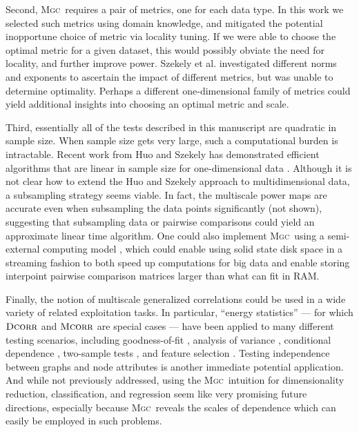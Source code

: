 \documentclass[11pt]{article}
\providecommand{\sct}[1]{{\normalfont\textsc{#1}}}
\newcommand{\Mgc}{\sct{Mgc}}
\newcommand{\Dcorr}{\sct{Dcorr}}
\newcommand{\Mcorr}{\sct{Mcorr}}
\begin{document}
Second, \Mgc~requires a pair of metrics, one for each data type. In this work we selected such metrics using domain knowledge, and mitigated the potential inopportune choice of metric via locality tuning.  If we were able to choose the optimal metric for a given dataset, this would possibly obviate the need for locality, and further improve power. Szekely et al. investigated different norms and exponents to ascertain the impact of different metrics, but was unable to determine optimality.
Perhaps a different one-dimensional family of metrics could yield additional insights into choosing an optimal metric and scale.

Third, essentially all of the tests described in this manuscript are quadratic in sample size.  When sample size gets very large, such a computational burden is intractable.  Recent work from Huo and Szekely  has demonstrated efficient algorithms that are linear in sample size  for one-dimensional data \cite{Huo2016}.  Although it is not clear how to extend the Huo and Szekely approach  to multidimensional data, a subsampling strategy seems viable.  In fact, the multiscale power maps are accurate even when subsampling the data points significantly (not shown), suggesting that subsampling data or pairwise comparisons  could yield an approximate linear time algorithm.  One could also implement \Mgc~using a semi-external computing model \cite{Zheng2016},  which could enable using solid state disk space in a streaming fashion to both speed up computations for big data and enable storing interpoint pairwise comparison matrices larger than what can fit in RAM.

Finally, the notion of multiscale generalized correlations could be used in a wide variety of related exploitation tasks.  In particular, ``energy statistics'' --- for which $\Dcorr$ and $\Mcorr$ are special cases --- have been applied to many different testing scenarios, including goodness-of-fit  \cite{Szekely2005}, analysis of variance  \cite{Rizzo2010}, conditional dependence  \cite{Szekely2014,Wang2015},  two-sample tests \cite{Szekely2004}, and feature selection \cite{LiZhongZhu2012,Zhong2015}.   
Testing independence between graphs and node attributes \cite{Fosdick2015} is another immediate potential application.  And while not previously addressed, using the \Mgc~intuition for dimensionality reduction, classification, and regression seem like very promising future directions, especially because \Mgc~reveals the scales of dependence which can easily be employed in such problems.
\end{document}
